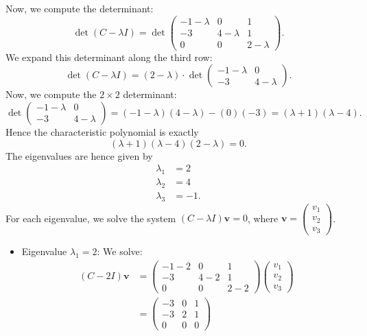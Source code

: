 \documentclass[addpoints, 12pt,answers]{exam}
\begin{document}
\begin{questions}
\begin{solution}
  Now, we compute the determinant:
  \[
  \det(C - \lambda I) = \det \begin{pmatrix} -1 - \lambda & 0 & 1 \\ -3 & 4 - \lambda & 1 \\ 0 & 0 & 2 - \lambda \end{pmatrix}.
  \]
  We expand this determinant along the third row:
  \[
  \det(C - \lambda I) = (2 - \lambda) \cdot \det \begin{pmatrix} -1 - \lambda & 0 \\ -3 & 4 - \lambda \end{pmatrix}.
  \]
  Now, we compute the $2 \times 2$ determinant:
  \[
  \det \begin{pmatrix} -1 - \lambda & 0 \\ -3 & 4 - \lambda \end{pmatrix} = (-1 - \lambda)(4 - \lambda) - (0)(-3) = (\lambda+1)(\lambda-4).
  \]
  Hence the characteristic polynomial is exactly
  \[ (\lambda+1)(\lambda-4)(2-\lambda) = 0. \]
  The eigenvalues are hence given by
  \begin{align*}
    \lambda_1 &= 2 \\
    \lambda_2 &= 4 \\
    \lambda_3 &= -1.
  \end{align*}
  For each eigenvalue, we solve the system $(C - \lambda I)\mathbf{v} = 0$, where $\mathbf{v} = \begin{pmatrix} v_1 \\ v_2 \\ v_3 \end{pmatrix}$.
  \begin{itemize}
  \item {Eigenvalue $\lambda_1 = 2$:}
  We solve:
  \begin{align*}
    (C - 2I) \mathbf{v}
    &= \begin{pmatrix} -1 - 2 & 0 & 1 \\ -3 & 4 - 2 & 1 \\ 0 & 0 & 2 - 2 \end{pmatrix} \begin{pmatrix} v_1 \\ v_2 \\ v_3 \end{pmatrix} \\
    &= \begin{pmatrix} -3 & 0 & 1 \\ -3 & 2 & 1 \\ 0 & 0 & 0 \end{pmatrix}

\end{align*}
\end{itemize}
\end{solution}
\end{questions}
\end{document}
